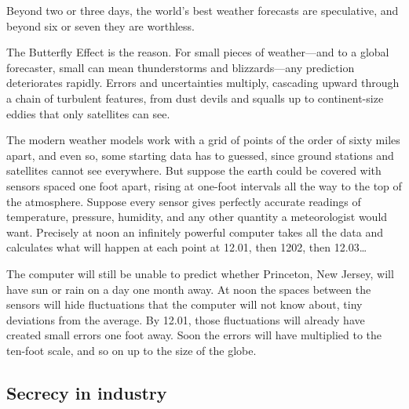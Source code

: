 \documentclass[11pt]{article}
\begin{document}
Beyond two or three days, the world's best weather forecasts are speculative, and beyond six or seven they are worthless.

The Butterfly Effect is the reason. For small pieces of weather---and to a global forecaster, small can mean thunderstorms and blizzards---any prediction deteriorates rapidly. Errors and uncertainties multiply, cascading upward through a chain of turbulent features, from dust devils and squalls up to continent-size eddies that only satellites can see.

The modern weather models work with a grid of points of the order of sixty miles apart, and even so, some starting data has to guessed, since ground stations and satellites cannot see everywhere. But suppose the earth could be covered with sensors spaced one foot apart, rising at one-foot intervals all the way to the top of the atmosphere. Suppose every sensor gives perfectly accurate readings of temperature, pressure, humidity, and any other quantity a meteorologist would want. Precisely at noon an infinitely powerful computer takes all the data and calculates what will happen at each point at 12.01, then 1202, then 12.03\ldots{}

The computer will still be unable to predict whether Princeton, New Jersey, will have sun or rain on a day one month away. At noon the spaces between the sensors will hide fluctuations that the computer will not know about, tiny deviations from the average. By 12.01, those fluctuations will already have created small errors one foot away. Soon the errors will have multiplied to the ten-foot scale, and so on up to the size of the globe.
\subsection{Secrecy in industry}
\label{sec-2-15}
\end{document}
